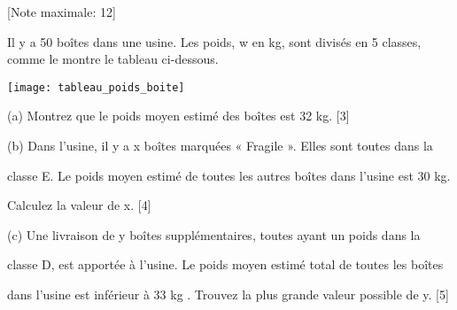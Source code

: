 \begin{question}
  \hspace*{\fill} [Note maximale: 12]\par
  \medskip
  \noindent Il y a 50 boîtes dans une usine. Les poids, w en kg, sont divisés en 5 classes, comme le montre le tableau ci-dessous.\par
  \medskip
  \texttt{[image: tableau\_poids\_boite]}\par
  \medskip
  (a) Montrez que le poids moyen estimé des boîtes est 32 kg.\hspace*{\fill} [3]\par
  \medskip

  (b) Dans l’usine, il y a x boîtes marquées « Fragile ». Elles sont toutes dans la\par
  \hspace{2em}classe E. Le poids moyen estimé de toutes les autres boîtes dans l’usine est 30 kg.\par
  \hspace{2em}Calculez la valeur de x.\hspace*{\fill} [4]\par
  \medskip

  (c) Une livraison de y boîtes supplémentaires, toutes ayant un poids dans la\par
  \hspace{2em}classe D, est apportée à l’usine. Le poids moyen estimé total de toutes les boîtes\par
  \hspace{2em}dans l’usine est inférieur à 33 kg . Trouvez la plus grande valeur possible de y.\hspace*{\fill} [5]\par

\end{question}


